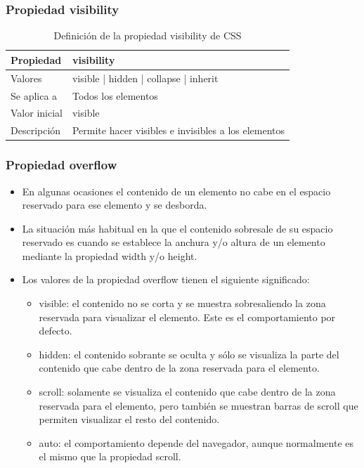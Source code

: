 
\begin{frame}
\frametitle{Propiedad visibility}

\begin{center}
  \begin{table}
   \begin{tabular}{p{1.8cm}p{7.8cm}}
Propiedad & \bf{visibility} \\ \hline
Valores& visible | hidden | collapse | inherit \\ \hline
Se aplica a& Todos los elementos \\ \hline
Valor inicial& visible \\ \hline
Descripción& Permite hacer visibles e invisibles a los elementos \\ \hline
  \end{tabular}
   \caption{Definición de la propiedad visibility de CSS}
 \end{table}
\end{center}


\end{frame}



\begin{frame}
\frametitle{Propiedad overflow}

\begin{itemize}
  \item En algunas ocasiones el contenido de un elemento no cabe en el espacio reservado para ese elemento y se desborda.
  \item La situación más habitual en la que el contenido sobresale de su espacio reservado es cuando se establece la anchura y/o altura de un elemento mediante la propiedad width y/o height. 
  \item Los valores de la propiedad overflow tienen el siguiente significado:
  \begin{itemize}
    \item visible: el contenido no se corta y se muestra sobresaliendo la zona reservada para visualizar el elemento. Este es el comportamiento por defecto.
    \item hidden: el contenido sobrante se oculta y sólo se visualiza la parte del contenido que cabe dentro de la zona reservada para el elemento.
    \item scroll: solamente se visualiza el contenido que cabe dentro de la zona reservada para el elemento, pero también se muestran barras de scroll que permiten visualizar el resto del contenido.
    \item auto: el comportamiento depende del navegador, aunque normalmente es el mismo que la propiedad scroll.
  \end{itemize}
\end{itemize}

\end{frame}


